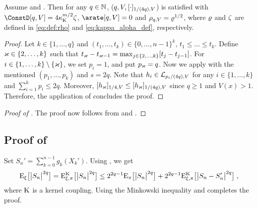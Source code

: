 \begin{corollary}
\label{coro:centered_moments_wasserstein_new}
Assume  and . Then for any $q \in \nset$, ($q,V,\Nnorm[1/(4q),V]{\cdot}$) is satisfied with $\ConstD[q,V] = 4 \boundmetric^{m/2}\constlemqnpi$, $\arate[q,V] = 0$ and $\rho_{q,V} = \ratewas^{1/2}$, where $\ratewas$ and $\constlemqnpi$ are defined in \eqref{eq:def:rho} and \eqref{eq:kappa_alpha_def}, respectively.
\end{corollary}
\begin{proof}
  Let $k \in \{1,\ldots,q\}$ and
 $(t_1,\dots,t_{k}) \in \{0,\ldots,n-1\}^{k}$, $t_1 \leq \dots\leq t_{k}$.
  Define $\maxind \in \{2,\ldots,k\}$ such that $t_{\maxind} - t_{\maxind-1} = \max_{j \in \{2,\ldots,k\}} [t_j - t_{j-1}]$. For $i \in \{1,\ldots,k\} \setminus \{\maxind\}$, we set $p_{i} = 1$, and put $p_{\maxind} = q$.
  Now we apply  with the mentioned $(p_1,\dots, p_k)$ and $s = 2q$.  Note that $ h_i \in \Lclass_{p_i/(4q), V}$ for any $i \in \{1,\ldots,k\}$ and $\sum_{i=1}^k p_i \leq 2q$. Moreover, $\Nnorm[1/4, V]{h_{\maxind}} \leq \Nnorm[1/(4q),V]{h_{\maxind}}$ since $q \geq 1$ and $V(x) > 1$. Therefore, the application of   concludes the proof.
\end{proof}

\begin{proof}[Proof of ] The proof now follows from  and .
\end{proof}


\subsection{Proof of }
\label{sec:proof-crefth_wass_change_mease}
Set $S_n' = \sum_{k=0}^{n-1} g_k(X_k')$. Using , we get
\begin{equation}
  \label{eq:sec:proof-crefth_wass_change_mease_1}
    \PE_\xi\big[ \big|S_n \big|^{2q} \big] = \PE_{\xi,\pi}^{\MKK}\big[ \big|S_n \big|^{2q} \big]   \leq 2^{2q-1} \PE_\pi\big[ \big|S_n \big|^{2q} \big]  +
     2^{2q-1} \PE_{\xi,\pi}^{\MKK}\big[ \big|S_n-S_n' \big|^{2q} \big]\eqsp,
  \end{equation}
where $\MKK$ is a kernel coupling. Using the Minkowski inequality and  completes the proof.

